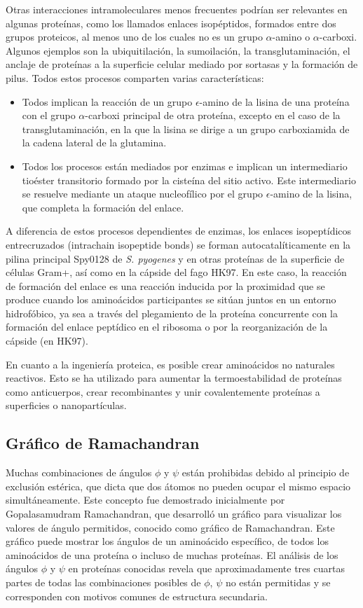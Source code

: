 Otras interacciones intramoleculares menos frecuentes podrían ser relevantes en algunas proteínas, como los llamados enlaces isopéptidos, formados entre dos grupos proteicos, al menos uno de los cuales no es un grupo $\alpha$-amino o $\alpha$-carboxi. Algunos ejemplos son la ubiquitilación, la sumoilación, la transglutaminación, el anclaje de proteínas a la superficie celular mediado por sortasas y la formación de pilus. Todos estos procesos comparten varias características:
\begin{itemize}
\item Todos implican la reacción de un grupo $\epsilon$-amino de la lisina de una proteína con el grupo $\alpha$-carboxi principal de otra proteína, excepto en el caso de la transglutaminación, en la que la lisina se dirige a un grupo carboxiamida de la cadena lateral de la glutamina.
\item Todos los procesos están mediados por enzimas e implican un intermediario tioéster transitorio formado por la cisteína del sitio activo. Este intermediario se resuelve mediante un ataque nucleofílico por el grupo $\epsilon$-amino de la lisina, que completa la formación del enlace.
\end{itemize}

A diferencia de estos procesos dependientes de enzimas, los enlaces isopeptídicos entrecruzados (intrachain isopeptide bonds) se forman autocatalíticamente en la pilina principal Spy0128 de \textit{S. pyogenes} y en otras proteínas de la superficie de células Gram+, así como en la cápside del fago HK97. En este caso, la reacción de formación del enlace es una reacción inducida por la proximidad que se produce cuando los aminoácidos participantes se sitúan juntos en un entorno hidrofóbico, ya sea a través del plegamiento de la proteína concurrente con la formación del enlace peptídico en el ribosoma o por la reorganización de la cápside (en HK97).

En cuanto a la ingeniería proteica, es posible crear aminoácidos no naturales reactivos. Esto se ha utilizado para aumentar la termoestabilidad de proteínas como anticuerpos, crear recombinantes y unir covalentemente proteínas a superficies o nanopartículas.

\subsection{Gráfico de Ramachandran}
Muchas combinaciones de ángulos $\phi$ y $\psi$ están prohibidas debido al principio de exclusión estérica, que dicta que dos átomos no pueden ocupar el mismo espacio simultáneamente. Este concepto fue demostrado inicialmente por Gopalasamudram Ramachandran, que desarrolló un gráfico para visualizar los valores de ángulo permitidos, conocido como gráfico de Ramachandran. Este gráfico puede mostrar los ángulos de un aminoácido específico, de todos los aminoácidos de una proteína o incluso de muchas proteínas. El análisis de los ángulos $\phi$ y $\psi$ en proteínas conocidas revela que aproximadamente tres cuartas partes de todas las combinaciones posibles de $\phi$, $\psi$ no están permitidas y se corresponden con motivos comunes de estructura secundaria.

